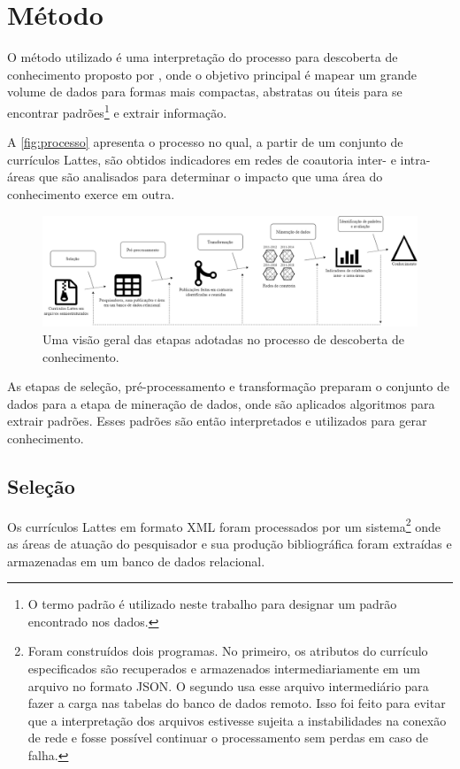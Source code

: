 \chapter[Método]{Método}

O método utilizado é uma interpretação do processo para descoberta de conhecimento proposto por , onde o objetivo principal é mapear um grande volume de dados para formas mais compactas, abstratas ou úteis para se encontrar padrões\footnote{O termo padrão é utilizado neste trabalho para designar um padrão encontrado nos dados.} e extrair informação.

A \autoref{fig:processo} apresenta o processo no qual, a partir de um conjunto de currículos Lattes, são obtidos indicadores em redes de coautoria inter- e intra-áreas que são analisados para determinar o impacto que uma área do conhecimento exerce em outra.

\begin{figure}[htpb]
  \centering
  \includegraphics[width=1\textwidth]{figuras/metodo-diagrama-fayyad}
  \caption{Uma visão geral das etapas adotadas no processo de descoberta de conhecimento.}
  \label{fig:processo}
\end{figure}

As etapas de seleção, pré-processamento e transformação preparam o conjunto de dados para a etapa de mineração de dados, onde são aplicados algoritmos para extrair padrões. Esses padrões são então interpretados e utilizados para gerar conhecimento.

\section{Seleção}

Os currículos Lattes em formato XML foram processados por um sistema\footnote{Foram construídos dois programas. No primeiro, os atributos do currículo especificados são recuperados e armazenados intermediariamente em um arquivo no formato JSON. O segundo usa esse arquivo intermediário para fazer a carga nas tabelas do banco de dados remoto. Isso foi feito para evitar que a interpretação dos arquivos estivesse sujeita a instabilidades na conexão de rede e fosse possível continuar o processamento sem perdas em caso de falha.} onde as áreas de atuação do pesquisador e sua produção bibliográfica foram extraídas e armazenadas em um banco de dados relacional.

